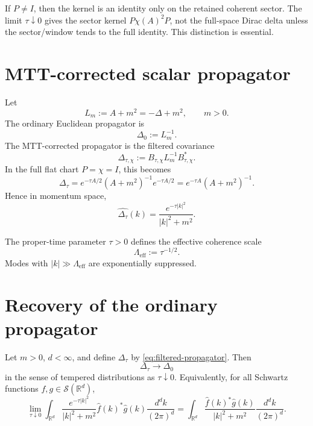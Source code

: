 \documentclass[11pt]{article}
\begin{document}
\begin{remark}
If \(P\neq I\), then the kernel is an identity only on the retained coherent sector. The limit \(\tau\downarrow0\) gives the sector kernel \(P\chi(A)^2P\), not the full-space Dirac delta unless the sector/window tends to the full identity. This distinction is essential.
\end{remark}

\section{MTT-corrected scalar propagator}

Let
\[
        L_m := A+m^2 = -\Delta+m^2,
        \qquad m>0.
\]
The ordinary Euclidean propagator is
\[
        \Delta_0 := L_m^{-1}.
\]
The MTT-corrected propagator is the filtered covariance
\[
        \Delta_{\tau,\chi}
        :=
        B_{\tau,\chi}L_m^{-1}B_{\tau,\chi}^{\ast}.
\]
In the full flat chart \(P=\chi=I\), this becomes
\[
        \Delta_\tau
        =
        e^{-\tau A/2}(A+m^2)^{-1}e^{-\tau A/2}
        =
        e^{-\tau A}(A+m^2)^{-1}.
\]
Hence in momentum space,
\begin{equation}
        \label{eq:filtered-propagator}
        \widehat{\Delta_\tau}(k)
        =
        \frac{e^{-\tau |k|^2}}{|k|^2+m^2}.
\end{equation}

\begin{definition}
The proper-time parameter \(\tau>0\) defines the effective coherence scale
\[
        \Lambda_{\mathrm{eff}}
        :=
        \tau^{-1/2}.
\]
Modes with \(|k|\gg \Lambda_{\mathrm{eff}}\) are exponentially suppressed.
\end{definition}

\section{Recovery of the ordinary propagator}

\begin{theorem}
Let \(m>0\), \(d<\infty\), and define \(\Delta_\tau\) by \cref{eq:filtered-propagator}. Then
\[
        \Delta_\tau \longrightarrow \Delta_0
\]
in the sense of tempered distributions as \(\tau\downarrow0\). Equivalently, for all Schwartz functions \(f,g\in\mathcal S(\mathbb R^d)\),
\[
        \lim_{\tau\downarrow0}
        \int_{\mathbb R^d}
        \frac{e^{-\tau |k|^2}}{|k|^2+m^2}
        \widehat f(k)^\ast \widehat g(k)
        \frac{d^dk}{(2\pi)^d}
        =
        \int_{\mathbb R^d}
        \frac{\widehat f(k)^\ast \widehat g(k)}{|k|^2+m^2}
        \frac{d^dk}{(2\pi)^d}.
\]
\end{theorem}
\end{document}
